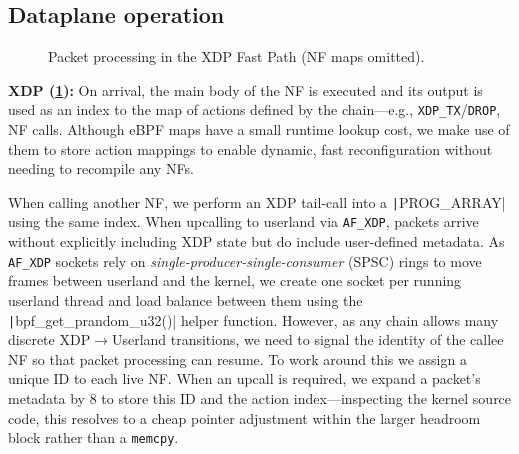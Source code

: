 \documentclass[comsoc, conference, times]{IEEEtran}
\newcommand{\afxdp}{\texttt{AF\_XDP}}
\newcommand{\fakepara}[1]{\noindent\textbf{#1:}}
\begin{document}

%
%

\subsection{Dataplane operation}

\begin{figure}
	\centering
	\resizebox{0.9\linewidth}{!}{}
	\caption{Packet processing in the XDP Fast Path (NF maps omitted).\label{fig:dplane-xdp}}
\end{figure}

\fakepara{XDP (\cref{fig:dplane-xdp})}
On arrival, the main body of the NF is executed and its output is used as an index to the map of actions defined by the chain---e.g., \texttt{XDP\_TX}/\texttt{DROP}, NF calls.
Although eBPF maps have a small runtime lookup cost, we make use of them to store action mappings to enable dynamic, fast reconfiguration without needing to recompile any NFs.

When calling another NF, we perform an XDP tail-call into a \texttt|PROG_ARRAY| using the same index.
When upcalling to userland via \afxdp, packets arrive without explicitly including XDP state but do include user-defined metadata.
As \afxdp{} sockets rely on \emph{single-producer-single-consumer} (SPSC) rings to move frames between userland and the kernel, we create one socket per running userland thread and load balance between them using the \texttt|bpf_get_prandom_u32()| helper function.
However, as any chain allows many discrete XDP$\rightarrow$Userland transitions, we need to signal the identity of the callee NF so that packet processing can resume.
To work around this we assign a unique ID to each live NF.
When an upcall is required, we expand a packet's metadata by \qty{8}{\byte} to store this ID and the action index---inspecting the kernel source code, this resolves to a cheap pointer adjustment within the larger headroom block rather than a \texttt{memcpy}.
\end{document}
